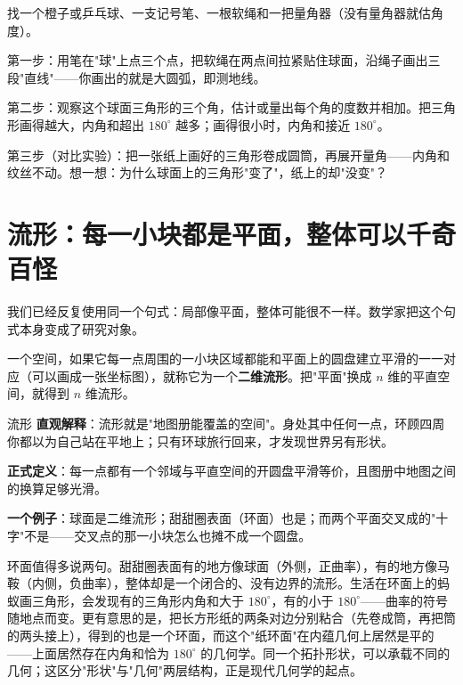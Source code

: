 \begin{shiyan}
找一个橙子或乒乓球、一支记号笔、一根软绳和一把量角器（没有量角器就估角度）。

第一步：用笔在"球"上点三个点，把软绳在两点间拉紧贴住球面，沿绳子画出三段"直线"——你画出的就是大圆弧，即测地线。

第二步：观察这个球面三角形的三个角，估计或量出每个角的度数并相加。把三角形画得越大，内角和超出 $180^\circ$ 越多；画得很小时，内角和接近 $180^\circ$。

第三步（对比实验）：把一张纸上画好的三角形卷成圆筒，再展开量角——内角和纹丝不动。想一想：为什么球面上的三角形"变了"，纸上的却"没变"？
\end{shiyan}

\section{流形：每一小块都是平面，整体可以千奇百怪}

我们已经反复使用同一个句式：局部像平面，整体可能很不一样。数学家把这个句式本身变成了研究对象。

\begin{dingyi}
一个空间，如果它每一点周围的一小块区域都能和平面上的圆盘建立平滑的一一对应（可以画成一张坐标图），就称它为一个\textbf{二维流形}。把"平面"换成 $n$ 维的平直空间，就得到 $n$ 维流形。
\end{dingyi}

\begin{shuyu}{流形}
\textbf{直观解释}：流形就是"地图册能覆盖的空间"。身处其中任何一点，环顾四周你都以为自己站在平地上；只有环球旅行回来，才发现世界另有形状。

\textbf{正式定义}：每一点都有一个邻域与平直空间的开圆盘平滑等价，且图册中地图之间的换算足够光滑。

\textbf{一个例子}：球面是二维流形；甜甜圈表面（环面）也是；而两个平面交叉成的"十字"不是——交叉点的那一小块怎么也摊不成一个圆盘。
\end{shuyu}

环面值得多说两句。甜甜圈表面有的地方像球面（外侧，正曲率），有的地方像马鞍（内侧，负曲率），整体却是一个闭合的、没有边界的流形。生活在环面上的蚂蚁画三角形，会发现有的三角形内角和大于 $180^\circ$，有的小于 $180^\circ$——曲率的符号随地点而变。更有意思的是，把长方形纸的两条对边分别粘合（先卷成筒，再把筒的两头接上），得到的也是一个环面，而这个"纸环面"在内蕴几何上居然是平的——上面居然存在内角和恰为 $180^\circ$ 的几何学。同一个拓扑形状，可以承载不同的几何；这区分"形状"与"几何"两层结构，正是现代几何学的起点。


